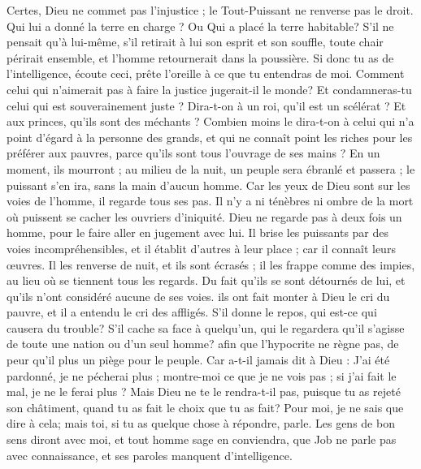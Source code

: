 \begin{multicols}{2}
Certes, Dieu ne commet pas l'injustice ; le Tout-Puissant ne renverse pas le droit.
Qui lui a donné la terre en charge ? Ou Qui a placé la terre habitable?
S'il ne pensait qu'à lui-même, s'il retirait à lui son esprit et son souffle,
toute chair périrait ensemble, et l'homme retournerait dans la poussière.
Si donc tu as de l'intelligence, écoute ceci, prête l'oreille à ce que tu entendras de moi.
Comment celui qui n'aimerait pas à faire la justice jugerait-il le monde? Et condamneras-tu celui qui est souverainement juste ?
Dira-t-on à un roi, qu'il est un scélérat ? Et aux princes, qu'ils sont des méchants ?
Combien moins le dira-t-on à celui qui n'a point d'égard à la personne des grands, et qui ne connaît point les riches pour les préférer aux pauvres, parce qu'ils sont tous l'ouvrage de ses mains ?
En un moment, ils mourront ; au milieu de la nuit, un peuple sera ébranlé et passera ; le puissant s'en ira, sans la main d'aucun homme.
Car les yeux de Dieu sont sur les voies de l'homme, il regarde tous ses pas.
Il n'y a ni ténèbres ni ombre de la mort où puissent se cacher les ouvriers d'iniquité.
Dieu ne regarde pas à deux fois un homme, pour le faire aller en jugement avec lui.
Il brise les puissants par des voies incompréhensibles, et il établit d'autres à leur place ;
car il connaît leurs œuvres. Il les renverse de nuit, et ils sont écrasés ;
il les frappe comme des impies, au lieu où se tiennent tous les regards.
Du fait qu'ils se sont détournés de lui, et qu'ils n'ont considéré aucune de ses voies.
ils ont fait monter à Dieu le cri du pauvre, et il a entendu le cri des affligés.
S'il donne le repos, qui est-ce qui causera du trouble? S'il cache sa face à quelqu'un, qui le regardera qu'il s'agisse de toute une nation ou d'un seul homme?
afin que l'hypocrite ne règne pas, de peur qu'il plus un piège pour le peuple.
Car a-t-il jamais dit à Dieu : J'ai été pardonné, je ne pécherai plus ;
montre-moi ce que je ne vois pas ; si j'ai fait le mal, je ne le ferai plus ?
Mais Dieu ne te le rendra-t-il pas, puisque tu as rejeté son châtiment, quand tu as fait le choix que tu as fait? Pour moi, je ne sais que dire à cela; mais toi, si tu as quelque chose à répondre, parle.
Les gens de bon sens diront avec moi, et tout homme sage en conviendra,
que Job ne parle pas avec connaissance, et ses paroles manquent d'intelligence.

\end{multicols}
